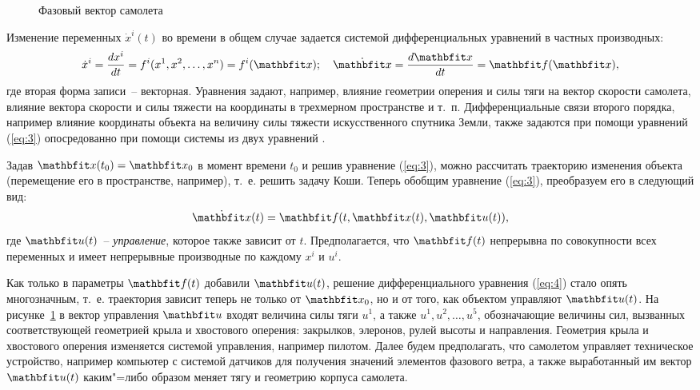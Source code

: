 \documentclass[a4paper,14pt, openany, twoside, final]{extbook} %
\begin{document}
\begin{figure}[bh]
  \centering
  \footnotesize
      \def\xyz{$x^1,x^2,x^3,\;x^4,x^5,x^6$} \def\yaw{$x^7,x^8$} \def\pitch{$x^9,x^{10}$}
      \def\roll{$\!\!\!\!\!\!x^{11},x^{12}$} \def\lift{$x^{13}$} \def\down{$\!\!x^{14}$}
      \def\thrust{$u^1$} \def\rudder{$u^5$} \def\drag{$x^{15}$}
      \def\flaps{$u^2$} \def\aeleron{$u^3$} \def\engine{}
      \def\elevator{$u^4$} \def\svgwidth{0.80\columnwidth}
      
  \caption{Фазовый вектор самолета}
  \label{fig:phasecoords}
\end{figure}

Изменение переменных $\dot{x}^i(t)$ во времени в общем случае задается системой дифференциальных уравнений в частных производных:
\begin{equation}
  \label{eq:3}
\dot{x}^i=\frac{dx^i}{dt}=f^i(x^1,x^2,\ldots,x^n)=f^i(\vecx);\quad
   \dot{\vecx}=\frac{d\vecx}{dt}=\vecf(\vecx),
\end{equation}
где вторая форма записи~-- векторная. Уравнения задают, например, влияние геометрии оперения и силы тяги на вектор скорости самолета, влияние вектора скорости и силы тяжести на координаты в трехмерном пространстве и т.~п.  Дифференциальные связи второго порядка, например влияние координаты объекта на величину силы тяжести искусственного спутника Земли, также задаются при помощи уравнений (\ref{eq:3}) опосредованно при помощи системы из двух уравнений \cite{pontr}.

Задав $\vecx(t_0)=\vecx_0$ в момент времени $t_0$ и решив уравнение (\ref{eq:3}), можно рассчитать траекторию изменения объекта (перемещение его в пространстве, например), т.~е. решить задачу Коши.  Теперь обобщим уравнение (\ref{eq:3}), преобразуем его в следующий вид:
\begin{equation}
  \label{eq:4}
  \dot{\vecx}(t)=\vecf(t,\vecx(t),\vecu(t)),
\end{equation}
где $\vecu(t)$~-- \emph{управление}, которое также зависит от $t$.  Предполагается, что $\vecf(t)$ непрерывна по совокупности всех переменных и имеет непрерывные производные по каждому $x^i$ и $u^i$.

Как только в параметры $\vecf(t)$ добавили $\vecu(t)$, решение дифференциального уравнения (\ref{eq:4}) стало опять многозначным, т.~е. траектория зависит теперь не только от $\vecx_0$, но и от того, как объектом управляют $\vecu(t)$.  На рисунке~\ref{fig:phasecoords} в вектор управления $\vecu$ входят величина силы тяги $u^1$, а также $u^1,u^2,\ldots,u^5$, обозначающие величины сил, вызванных соответствующей геометрией крыла и хвостового оперения: закрылков, элеронов, рулей высоты и направления.  Геометрия крыла и хвостового оперения изменяется системой управления, например пилотом.  Далее будем предполагать, что самолетом управляет техническое устройство, например компьютер с системой датчиков для получения значений элементов фазового ветра, а также выработанный им вектор $\vecu(t)$ каким"=либо образом меняет тягу и геометрию корпуса самолета.
\end{document}
